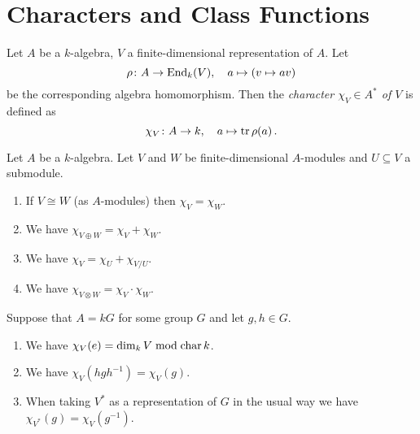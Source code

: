 \section{Characters and Class Functions}


\begin{defi}
  Let $A$ be a $k$-algebra, $V$ a finite-dimensional representation of $A$.
  Let
  \[
            \rho
    \colon  A
    \to     \operatorname{End}_k(V),
    \quad   a
    \mapsto (v \mapsto av)
  \]
  be the corresponding algebra homomorphism.
  Then the \emph{character $\chi_V \in A^*$ of $V$} is defined as
  \[
            \chi_V
    \colon  A
    \to     k,
    \quad   a
    \mapsto \operatorname{tr} \rho(a) \,.
  \]
\end{defi}


\begin{prop}\label{prop: properties characters}
  Let $A$ be a $k$-algebra.
  Let $V$ and $W$ be finite-dimensional $A$-modules and $U \subseteq V$ a submodule.
  \begin{enumerate}[label=\emph{\alph*)},leftmargin=*]
    \item
      If $V \cong W$ (as $A$-modules) then $\chi_V = \chi_W$.
    \item
      We have $\chi_{V \oplus W} = \chi_V + \chi_W$.
    \item
      We have $\chi_V = \chi_U + \chi_{V/U}$.
    \item
      We have $\chi_{V \otimes W} = \chi_V \cdot \chi_W$.
  \end{enumerate}
  Suppose that $A = kG$ for some group $G$ and let $g,h \in G$.
  \begin{enumerate}[label=\emph{\alph*)},leftmargin=*,resume]
    \item
      We have $\chi_V(e) = \dim_k V \bmod \operatorname{char} k$.
    \item
      We have $\chi_V(hgh^{-1}) = \chi_V(g)$.
    \item
      When taking $V^*$ as a representation of $G$ in the usual way we have $\chi_{V^*}(g) = \chi_V(g^{-1})$.
  \end{enumerate}
\end{prop}
